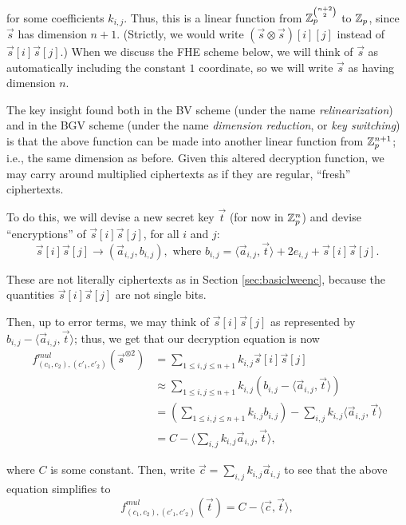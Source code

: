     for some coefficients $k_{i,j}$. Thus, this is a linear function from $\mathbb{Z}_p^{{n+2}\choose{2}}$ to $\mathbb{Z}_p$, since $\vec{s}$ has dimension $n+1$. (Strictly, we would write $(\vec{s} \otimes \vec{s})[i][j]$ instead of $\vec{s}[i] \vec{s}[j]$.) When we discuss the FHE scheme below, we will think of $\vec{s}$ as automatically including the constant $1$ coordinate, so we will write $\vec{s}$ as having dimension $n$.

    The key insight found both in the BV scheme (under the name \emph{relinearization}) and in the BGV scheme (under the name \emph{dimension reduction}, or \emph{key switching}) is that the above function can be made into another linear function from $\mathbb{Z}_p^{n+1}$; i.e., the same dimension as before. Given this altered decryption function, we may carry around multiplied ciphertexts as if they are regular, ``fresh'' ciphertexts.

    To do this, we will devise a new secret key $\vec{t}$ (for now in $\mathbb{Z}_p^n$) and devise ``encryptions'' of $\vec{s}[i] \vec{s}[j]$, for all $i$ and $j$:
    \[\vec{s}[i] \vec{s}[j] \to (\vec{a}_{i,j}, b_{i,j}), \text{ where } b_{i,j} = \langle \vec{a}_{i,j}, \vec{t} \rangle + 2 e_{i,j} + \vec{s}[i]\vec{s}[j].\]

    These are not literally ciphertexts as in Section \ref{sec:basiclweenc}, because the quantities $\vec{s}[i] \vec{s}[j]$ are not single bits.

    Then, up to error terms, we may think of $\vec{s}[i]\vec{s}[j]$ as represented by $b_{i,j} - \langle \vec{a}_{i,j} , \vec{t} \rangle$; thus, we get that our decryption equation is now
    \begin{align*}
        f^{mul}_{(c_1, c_2), (c'_1, c'_2)}(\vec{s}^{\otimes 2}) &= \sum_{1 \leq i,j \leq n+1} k_{i,j} \vec{s}[i]\vec{s}[j] \\
        &\approx  \sum_{1 \leq i,j \leq n+1} k_{i,j} (b_{i,j} - \langle \vec{a}_{i,j} , \vec{t} \rangle) \\
        &= \left( \sum_{1 \leq i,j\leq n+1} k_{i,j} b_{i,j} \right) - \sum_{i,j} k_{i,j} \langle \vec{a}_{i,j}, \vec{t} \rangle \\
        &= C - \langle \sum_{i,j} k_{i,j} \vec{a}_{i,j}, \vec{t} \rangle,
    \end{align*}

    where $C$ is some constant. Then, write $\vec{c} = \sum_{i,j} k_{i,j} \vec{a}_{i,j}$ to see that the above equation simplifies to
    \[f^{mul}_{(c_1, c_2), (c'_1, c'_2)}(\vec{t}) = C - \langle \vec{c}, \vec{t} \rangle,\]


